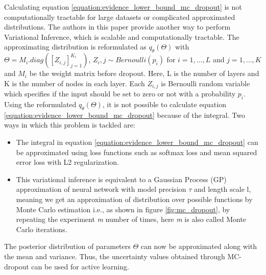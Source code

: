 Calculating equation \ref{equation:evidence_lower_bound_mc_dropout} is not computationally tractable for large datasets or complicated approximated distributions. The authors in this paper provide another way to perform Variational Inference, which is scalable and computationally tractable. The approximating distribution is reformulated as $q_{\theta}(\Theta)$ with $\Theta = M_i . diag([Z_{i, j}]_{j=1}^{K_i})$, $Z_i,j \sim Bernoulli(p_i)$ for $i = 1, ...,L$ and $j = 1, ...,K$ and $M_i$ be the weight matrix before dropout. Here, L is the number of layers and K is the number of nodes in each layer. Each $Z_{i,j}$ is Bernoulli random variable which specifies if the input should be set to zero or not with a probability $p_i$. \\
Using the reformulated $q_{\theta}(\Theta)$, it is not possible to calculate equation \ref{equation:evidence_lower_bound_mc_dropout} because of the integral. Two ways in which this problem is tackled are:
\begin{itemize}
  \setlength\itemsep{0em}
  \item The integral in equation \ref{equation:evidence_lower_bound_mc_dropout} can be approximated using loss functions such as softmax loss and mean squared error loss with L2 regularization.
  \item This variational inference is equivalent to a Gaussian Process (GP) approximation of neural network with model precision $\tau$ and length scale l, meaning we get an approximation of distribution over possible functions by Monte Carlo estimation \cite{raychaudhuri2008} i.e., as shown in figure \ref{fig:mc_dropout}, by repeating the experiment \textit{m} number of times, here \textit{m} is also called Monte Carlo iterations.
\end{itemize}
The posterior distribution of parameters $\Theta$ can now be approximated along with the mean and variance. Thus, the uncertainty values obtained through MC-dropout can be used for active learning.

